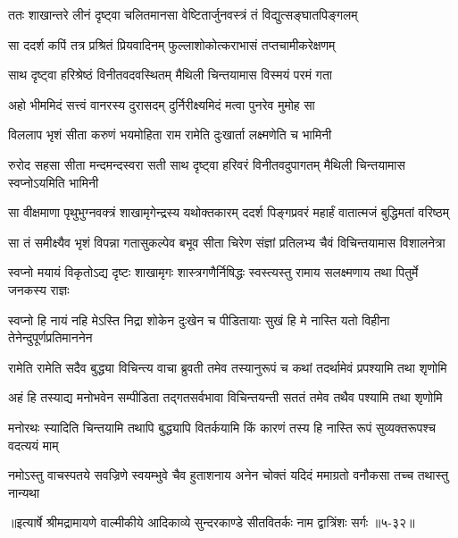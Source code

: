 
\twolineshloka
{ततः शाखान्तरे लीनं दृष्ट्वा चलितमानसा}
{वेष्टितार्जुनवस्त्रं तं विद्युत्सङ्घातपिङ्गलम्} %

\twolineshloka
{सा ददर्श कपिं तत्र प्रश्रितं प्रियवादिनम्}
{फुल्लाशोकोत्कराभासं तप्तचामीकरेक्षणम्} %

\twolineshloka
{साथ दृष्ट्वा हरिश्रेष्ठं विनीतवदवस्थितम्}
{मैथिली चिन्तयामास विस्मयं परमं गता} %

\twolineshloka
{अहो भीममिदं सत्त्वं वानरस्य दुरासदम्}
{दुर्निरीक्ष्यमिदं मत्वा पुनरेव मुमोह सा} %

\twolineshloka
{विललाप भृशं सीता करुणं भयमोहिता}
{राम रामेति दुःखार्ता लक्ष्मणेति च भामिनी} %

\threelineshloka
{रुरोद सहसा सीता मन्दमन्दस्वरा सती}
{साथ दृष्ट्वा हरिवरं विनीतवदुपागतम्}
{मैथिली चिन्तयामास स्वप्नोऽयमिति भामिनी} %

\twolineshloka
{सा वीक्षमाणा पृथुभुग्नवक्त्रं शाखामृगेन्द्रस्य यथोक्तकारम्}
{ददर्श पिङ्गप्रवरं महार्हं वातात्मजं बुद्धिमतां वरिष्ठम्} %

\twolineshloka
{सा तं समीक्ष्यैव भृशं विपन्ना गतासुकल्पेव बभूव सीता}
{चिरेण संज्ञां प्रतिलभ्य चैवं विचिन्तयामास विशालनेत्रा} %

\twolineshloka
{स्वप्नो मयायं विकृतोऽद्य दृष्टः शाखामृगः शास्त्रगणैर्निषिद्धः}
{स्वस्त्यस्तु रामाय सलक्ष्मणाय तथा पितुर्मे जनकस्य राज्ञः} %

\twolineshloka
{स्वप्नो हि नायं नहि मेऽस्ति निद्रा शोकेन दुःखेन च पीडितायाः}
{सुखं हि मे नास्ति यतो विहीना तेनेन्दुपूर्णप्रतिमाननेन} %

\twolineshloka
{रामेति रामेति सदैव बुद्ध्या विचिन्त्य वाचा ब्रुवती तमेव}
{तस्यानुरूपं च कथां तदर्थामेवं प्रपश्यामि तथा शृणोमि} %

\twolineshloka
{अहं हि तस्याद्य मनोभवेन सम्पीडिता तद्गतसर्वभावा}
{विचिन्तयन्ती सततं तमेव तथैव पश्यामि तथा शृणोमि} %

\twolineshloka
{मनोरथः स्यादिति चिन्तयामि तथापि बुद्ध्यापि वितर्कयामि}
{किं कारणं तस्य हि नास्ति रूपं सुव्यक्तरूपश्च वदत्ययं माम्} %

\twolineshloka
{नमोऽस्तु वाचस्पतये सवज्रिणे स्वयम्भुवे चैव हुताशनाय}
{अनेन चोक्तं यदिदं ममाग्रतो वनौकसा तच्च तथास्तु नान्यथा} %


॥इत्यार्षे श्रीमद्रामायणे वाल्मीकीये आदिकाव्ये सुन्दरकाण्डे सीतवितर्कः नाम द्वात्रिंशः सर्गः ॥५-३२॥

